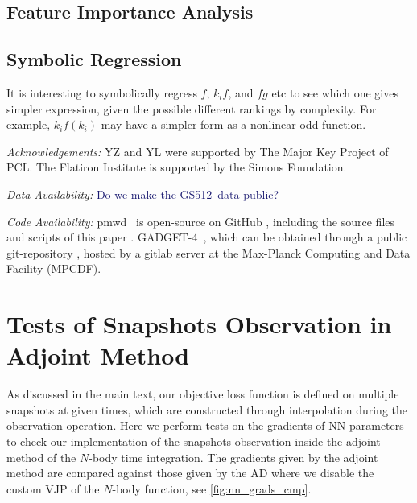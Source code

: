 \documentclass[modern, trackchanges, dvipsnames]{aastex631}
\newcommand{\pmwd}{{\usefont{T1}{nova}{m}{sl}pmwd}}
\newcommand{\GADGET}{{{\fontsize{10pt}{12pt}\selectfont GADGET}-4}}
\newcommand{\GSDATA}{{GS512}}
\newcommand{\YL}[1]{\textcolor{Bittersweet}{#1}}
\newcommand{\YZ}[1]{\textcolor{MidnightBlue}{#1}}
\begin{document}
\vspace{1em}
\subsection{Feature Importance Analysis}



\vspace{1em}
\subsection{Symbolic Regression}


\YL{It is interesting to symbolically regress $f$, $k_i f$, and $f g$
etc to see which one gives simpler expression, given the possible
different rankings by complexity.
For example, $k_i f(k_i)$ may have a simpler form as a nonlinear odd
function.}


\vspace{1em}
\textit{\large Acknowledgements:}
YZ and YL were supported by The Major Key Project of PCL.
The Flatiron Institute is supported by the Simons Foundation.


\vspace{1em}
\textit{\large Data Availability:}
\YZ{Do we make the \GSDATA\ data public?}


\vspace{1em}
\textit{\large Code Availability:}
\pmwd\ \citep{Li2022b} is open-source on GitHub
\href{https://github.com/eelregit/pmwd}{\faGithub}, including the source files
and scripts of this paper
\href{https://github.com/eelregit/pmwd/tree/master/docs/papers/sto}{\faFile}.
\GADGET\ \citep{GADGET-4}, which can be obtained through a public git-repository
\href{http://gitlab.mpcdf.mpg.de/vrs/gadget4}{\faGitlab}, hosted by a gitlab
server at the Max-Planck Computing and Data Facility (MPCDF).







\vspace{1em}
\appendix


\vspace{1em}
\section{Tests of Snapshots Observation in Adjoint Method}
As discussed in the main text, our objective loss function is defined on
multiple snapshots at given times, which are constructed through interpolation
during the observation operation.
Here we perform tests on the gradients of NN parameters to check our
implementation of the snapshots observation inside the adjoint method of the
$N$-body time integration.
The gradients given by the adjoint method are compared against those given by
the AD where we disable the custom VJP of the $N$-body function, see
\autoref{fig:nn_grads_cmp}.
\end{document}
